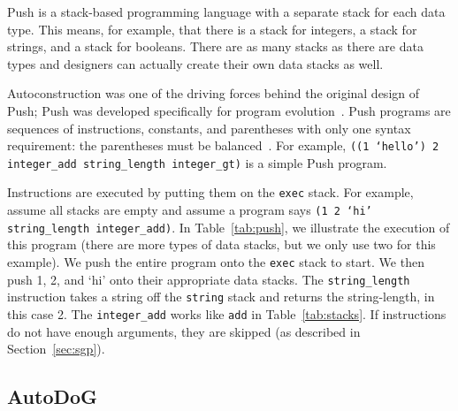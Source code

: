 \documentclass{sig-alternate}
\begin{document}
Push is a stack-based programming language with a separate stack for each data type. This means, for example, that there is a stack for integers, a stack for strings, and a stack for booleans. There are as many stacks as there are data types and designers can actually create their own data stacks as well.

Autoconstruction was one of the driving forces behind the original design of Push; Push was developed specifically for program evolution~\cite{spector:2016}. Push programs are sequences of instructions, constants, and parentheses with only one syntax requirement: the parentheses must be balanced~\cite{lee:2001}. For example, \texttt{((1 `hello') 2 integer\_add string\_length integer\_gt)} is a simple Push program.

Instructions are executed by putting them on the \texttt{exec} stack. For example, assume all stacks are empty and assume a program says \texttt{(1 2 `hi' string\_\-length integer\_add)}. In Table~\ref{tab:push}, we illustrate the execution of this program (there are more types of data stacks, but we only use two for this example). We push the entire program onto the \texttt{exec} stack to start. We then push 1, 2, and `hi' onto their appropriate data stacks. The \texttt{string\_length} instruction takes a string off the \texttt{string} stack and returns the string-length, in this case 2. The \texttt{integer\_add} works like \texttt{add} in Table~\ref{tab:stacks}. If instructions do not have enough arguments, they are skipped (as described in Section~\ref{sec:sgp}).~\cite{lee:tutorial}


\subsection{AutoDoG}
\label{sec:autodog}
\end{document}
